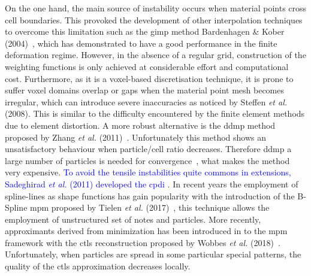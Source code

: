 \documentclass[preprint,12pt,a4paper]{elsarticle}
\newcommand{\MODIFIED}[1]{
  \textcolor{blue}{{#1}}
}
\begin{document}
On the one hand, the main source of instability occurs when
material points cross cell boundaries. This provoked the development
of other interpolation techniques to overcome this limitation such as
the \acrfull{gimp} method Bardenhagen \& Kober (2004)~\cite{Bardenhagen2004}, which has
demonstrated to have a good performance in the finite deformation
regime. However, in the absence of a regular grid, construction of the
weighting functions is only achieved at considerable effort and
computational cost.  Furthermore, as it is a voxel-based
discretisation technique, it is prone to suffer voxel domains overlap
or gaps when the material point mesh becomes irregular, which can
introduce severe inaccuracies as noticed by Steffen {\it et al.}
(2008)\cite{Steffen2008}. This is similar to the difficulty
encountered by the finite element methods due to element distortion.
A more robust alternative is the \acrfull{ddmp} method proposed by Zhang {\it et al.}
(2011)~\cite{Zhang2011a}. Unfortunately this method shows an
unsatisfactory behaviour when particle/cell ratio
decreases. Therefore \acrshort{ddmp} a large
number of particles is needed for convergence~\cite{DHAKAL2016301}, what makes the method very expensive. \MODIFIED{To avoid the tensile instabilities quite commons in extensions, Sadeghirad {\it et al.} (2011) \cite{Sadeghirad_et_al_IJNME_2011} developed the \acrshort{cpdi} \cite{Sadeghirad_et_al_IJNME_2011}}. In recent years the employment of spline-lines as shape functions has gain popularity with the introduction of the B-Spline 
\acrshort{mpm} proposed by Tielen {\it et al.} (2017)~\cite{TIELEN2017265},
this technique allows the employment of unstructured set of notes and
particles. More recently, approximants derived from minimization has
been introduced in to the \acrshort{mpm} framework with the \acrfull{ctls}
reconstruction proposed by Wobbes {\it et al.}
(2018)~\cite{E_Wobbes_2018}. Unfortunately, when particles are spread
in some particular special patterns, the quality of the \acrshort{ctls} approximation decreases locally.
\end{document}
